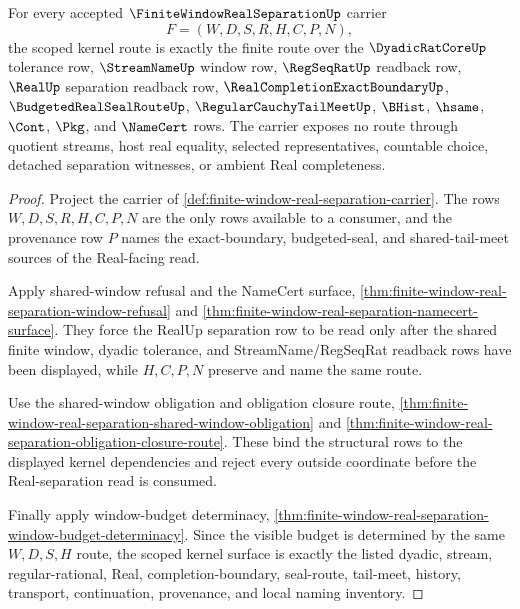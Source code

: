 \begin{theorem}
\label{thm:finite-window-real-separation-scoped-kernel-route}
For every accepted $\FiniteWindowRealSeparationUp$ carrier
$$
F=(W,D,S,R,H,C,P,N),
$$
the scoped kernel route is exactly the finite route over the $\DyadicRatCoreUp$ tolerance row, $\StreamNameUp$ window row, $\RegSeqRatUp$ readback row, $\RealUp$ separation readback row, $\RealCompletionExactBoundaryUp$, $\BudgetedRealSealRouteUp$, $\RegularCauchyTailMeetUp$, $\BHist$, $\hsame$, $\Cont$, $\Pkg$, and $\NameCert$ rows. The carrier exposes no route through quotient streams, host real equality, selected representatives, countable choice, detached separation witnesses, or ambient Real completeness.
\end{theorem}
\begin{proof}
Project the carrier of \autoref{def:finite-window-real-separation-carrier}. The rows $W,D,S,R,H,C,P,N$ are the only rows available to a consumer, and the provenance row $P$ names the exact-boundary, budgeted-seal, and shared-tail-meet sources of the Real-facing read.

Apply shared-window refusal and the NameCert surface, \autoref{thm:finite-window-real-separation-window-refusal} and \autoref{thm:finite-window-real-separation-namecert-surface}. They force the RealUp separation row to be read only after the shared finite window, dyadic tolerance, and StreamName/RegSeqRat readback rows have been displayed, while $H,C,P,N$ preserve and name the same route.

Use the shared-window obligation and obligation closure route, \autoref{thm:finite-window-real-separation-shared-window-obligation} and \autoref{thm:finite-window-real-separation-obligation-closure-route}. These bind the structural rows to the displayed kernel dependencies and reject every outside coordinate before the Real-separation read is consumed.

Finally apply window-budget determinacy, \autoref{thm:finite-window-real-separation-window-budget-determinacy}. Since the visible budget is determined by the same $W,D,S,H$ route, the scoped kernel surface is exactly the listed dyadic, stream, regular-rational, Real, completion-boundary, seal-route, tail-meet, history, transport, continuation, provenance, and local naming inventory.
\end{proof}

